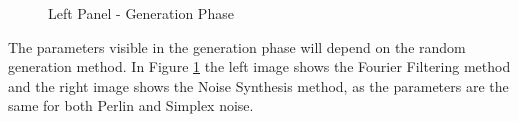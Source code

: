     \begin{figure}[H]
      \centering
      \caption{Left Panel - Generation Phase}
      \label{fig:leftbar-generation}
    \end{figure}
    
    The parameters visible in the generation phase will depend on the random generation method. In Figure \ref{fig:leftbar-generation} the left image shows the Fourier Filtering method and the right image shows the Noise Synthesis method, as the parameters are the same for both Perlin and Simplex noise.
  

